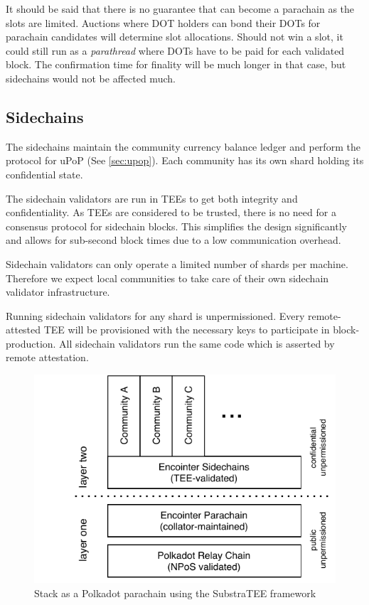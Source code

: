 \documentclass[conference]{IEEEtran}
\begin{document}
It should be said that there is no guarantee that \encointer can become a parachain as the slots are limited. Auctions where DOT holders can bond their DOTs for parachain candidates will determine slot allocations. Should \encointer not win a slot, it could still run as a \emph{parathread} where DOTs have to be paid for each validated block. The confirmation time for finality will be much longer in that case, but sidechains would not be affected much.

\subsection{Sidechains}

The \encointer sidechains maintain the community currency balance ledger and perform the \encointer protocol for uPoP (See \ref{sec:upop}). Each community has its own shard holding its confidential state.

The sidechain validators are run in TEEs to get both integrity and confidentiality. As TEEs are considered to be trusted, there is no need for a consensus protocol for sidechain blocks. This simplifies the design significantly and allows for sub-second block times due to a low communication overhead.

Sidechain validators can only operate a limited number of shards per machine. Therefore we expect local communities to take care of their own sidechain validator infrastructure.  

Running sidechain validators for any shard is unpermissioned. Every remote-attested TEE will be provisioned with the necessary keys to participate in block-production. All sidechain validators run the same code which is asserted by remote attestation.  

\begin{figure}
	\centering
	\def\svgwidth{\columnwidth}
	\includegraphics[width=\columnwidth]{parachain-architecture.pdf}
	\caption{\encointer Stack as a Polkadot parachain using the SubstraTEE framework}
	\label{fig:architecture}
\end{figure}
\end{document}
